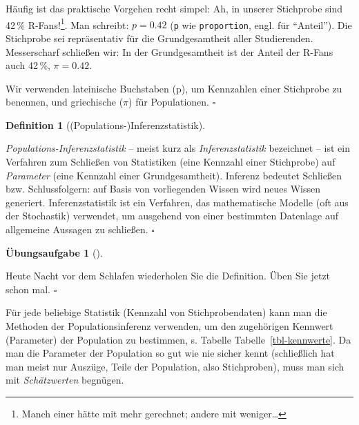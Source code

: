 \documentclass[
  ngerman,
  letterpaper,
  twoside,
  open=any]{scrbook}
\theoremstyle{definition}
\theoremstyle{plain}
\theoremstyle{definition}
\newtheorem{exercise}{Übungsaufgabe}[chapter]
\theoremstyle{definition}
\newtheorem{definition}{Definition}[chapter]
\theoremstyle{definition}
\theoremstyle{definition}
\newtheorem{exercise}{Übungsaufgabe}[chapter]
\theoremstyle{remark}
\begin{document}
Häufig ist das praktische Vorgehen recht simpel: Ah, in unserer
Stichprobe sind 42\,\% R-Fans!\footnote{Manch einer hätte mit mehr
  gerechnet; andere mit weniger\ldots{}}. Man schreibt: \(p = 0.42\)
(\texttt{p} wie \texttt{proportion}, engl. für \enquote{Anteil}). Die
Stichprobe sei repräsentativ für die Grundgesamtheit aller Studierenden.
Messerscharf schließen wir: In der Grundgesamtheit ist der Anteil der
R-Fans auch 42\,\%, \(\pi=0.42\).

\begin{tcolorbox}[enhanced jigsaw, arc=.35mm, bottomrule=.15mm, bottomtitle=1mm, breakable, colback=white, colbacktitle=quarto-callout-note-color!10!white, colframe=quarto-callout-note-color-frame, coltitle=black, left=2mm, leftrule=.75mm, opacityback=0, opacitybacktitle=0.6, rightrule=.15mm, title=\textcolor{quarto-callout-note-color}{\faInfo}\hspace{0.5em}{Hinweis}, titlerule=0mm, toprule=.15mm, toptitle=1mm]

Wir verwenden lateinische Buchstaben (p), um Kennzahlen einer Stichprobe
zu benennen, und griechische (\(\pi\)) für Populationen. \(\square\)

\end{tcolorbox}

\begin{definition}[(Populations-)Inferenzstatistik]\protect\hypertarget{def-inf}{}\label{def-inf}

\emph{Populations-Inferenzstatistik} -- meist kurz als
\emph{Inferenzstatistik} bezeichnet -- ist ein Verfahren zum Schließen
von Statistiken (eine Kennzahl einer Stichprobe) auf \emph{Parameter}
(eine Kennzahl einer Grundgesamtheit). Inferenz bedeutet Schließen bzw.
Schlussfolgern: auf Basis von vorliegenden Wissen wird neues Wissen
generiert. Inferenzstatistik ist ein Verfahren, das mathematische
Modelle (oft aus der Stochastik) verwendet, um ausgehend von einer
bestimmten Datenlage auf allgemeine Aussagen zu schließen. \(\square\)

\end{definition}

\begin{exercise}[]\protect\hypertarget{exr-inf}{}\label{exr-inf}

Heute Nacht vor dem Schlafen wiederholen Sie die Definition. Üben Sie
jetzt schon mal. \(\square\)

\end{exercise}

Für jede beliebige Statistik (Kennzahl von Stichprobendaten) kann man
die Methoden der Populationsinferenz verwenden, um den zugehörigen
Kennwert (Parameter) der Population zu bestimmen, s. Tabelle
Tabelle~\ref{tbl-kennwerte}. Da man die Parameter der Population so gut
wie nie sicher kennt (schließlich hat man meist nur Auszüge, Teile der
Population, also Stichproben), muss man sich mit \emph{Schätzwerten}
begnügen.
\end{document}
